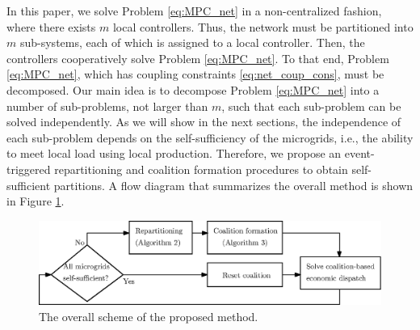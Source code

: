 In this paper, we solve Problem \eqref{eq:MPC_net} in a non-centralized fashion, where there exists $m$ local controllers. Thus, the network must be partitioned into $m$ sub-systems, each of which is assigned to a local controller. \color{black}Then, the controllers cooperatively solve Problem \eqref{eq:MPC_net}. To that end, Problem \eqref{eq:MPC_net}, which has coupling constraints \eqref{eq:net_coup_cons}, must be decomposed. Our main idea is to decompose Problem \eqref{eq:MPC_net} into a number of sub-problems, not larger than $m$, such that each sub-problem can be solved independently. As we will show in the next sections, the independence of each sub-problem depends on the self-sufficiency of the microgrids, i.e., the ability to meet local load using local production. Therefore, we propose an event-triggered repartitioning and coalition formation procedures to obtain self-sufficient partitions. %
A flow diagram that summarizes the overall method is shown in Figure \ref{fig:prop_sch}. 
\begin{figure}
	\centering
	\includegraphics[scale=0.5]{img/ov_sch}
	\caption{The overall scheme of the proposed method.
	}
	\label{fig:prop_sch}
\end{figure}


 
